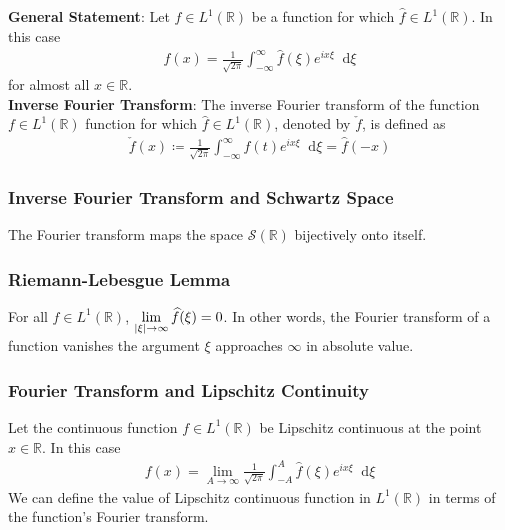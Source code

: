 \documentclass[11pt, a4paper]{article}
\newcommand{\diff}{\mathop{}\!\mathrm{d}} %
\newcommand{\R}{\mathbb{R}} %
\begin{document}
\textbf{General Statement}: Let $ f \in L^{1}(\R) $ be a function for which $ \widehat{f}  \in L^{1}(\R) $. In this case
\begin{align*}
	f(x) = \frac{1}{\sqrt{2\pi}} \int_{-\infty}^{\infty} \widehat{f}(\xi) e^{ix \xi} \diff \xi
\end{align*}
for almost all $ x \in \R $. \\

\textbf{Inverse Fourier Transform}: The inverse Fourier transform of the function  $ f \in L^{1}(\R) $ function for which $ \widehat{f}  \in L^{1}(\R) $, denoted by $ \check{f} $, is defined as
\begin{align*}
	\check{f}(x) \coloneqq \frac{1}{\sqrt{2\pi}} \int_{-\infty}^{\infty} f(t) e^{i x \xi} \diff \xi = \widehat{f}(-x)
\end{align*}

\subsubsection{Inverse Fourier Transform and Schwartz Space}
The Fourier transform maps the space $ \mathcal{S}(\R) $ bijectively onto itself.

\subsubsection{Riemann-Lebesgue Lemma}
For all $ f \in L^{1}(\R) $, $ \displaystyle{\lim_{\abs{\xi} \to \infty} \widehat{f}(\xi) = 0} $.
In other words, the Fourier transform of a function vanishes the argument $ \xi $ approaches $ \infty $ in absolute value.

\subsubsection{Fourier Transform and Lipschitz Continuity}
Let the continuous function $ f \in L^{1}(\R) $ be Lipschitz continuous at the point $ x \in \R $. In this case
\begin{align*}
	f(x) = \lim_{A \to \infty} \frac{1}{\sqrt{2\pi}} \int_{-A}^{A} \widehat{f}(\xi) e^{ix\xi} \diff \xi
\end{align*}
We can define the value of Lipschitz continuous function in $ L^{1}(\R) $ in terms of the function's Fourier transform.
\end{document}
